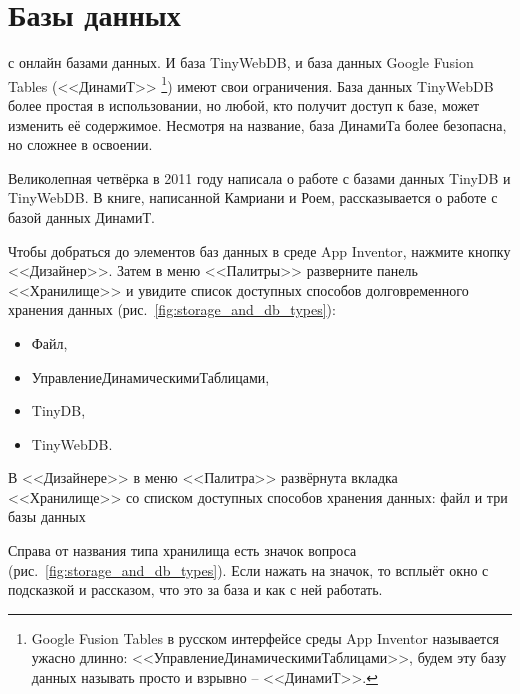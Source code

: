\chapter{Базы данных}
\label{ch:databases}

 с онлайн базами данных. 
И база TinyWebDB, и база данных 
Google Fusion Tables (<<ДинамиТ>>%
\footnote[][-1.0cm]{
        Google Fusion Tables в русском интерфейсе среды App Inventor называется 
        ужасно длинно: <<УправлениеДинамическимиТаблицами>>, 
        будем эту базу данных называть просто и взрывно -- <<ДинамиТ>>. 
}) имеют свои ограничения.
База данных TinyWebDB более простая в использовании, 
но любой, кто получит доступ к базе, может изменить её содержимое. 
Несмотря на название, база ДинамиТа более безопасна, но сложнее в освоении. 

Великолепная четвёрка в 2011 году написала о работе с базами данных 
TinyDB и TinyWebDB\cite{Wolber2011}. 
В книге, написанной Камриани и Роем\cite{KamrianiAndRoy2016}, 
рассказывается о работе с базой данных ДинамиТ. 

Чтобы добраться до элементов баз данных в среде App Inventor, 
нажмите кнопку <<Дизайнер>>. 
Затем в меню <<Палитры>> разверните панель <<Хранилище>> и увидите 
список доступных способов долговременного хранения данных (рис.~\ref{fig:storage_and_db_types}): 
\begin{itemize}
    \item Файл,
    \item УправлениеДинамическимиТаблицами,
    \item TinyDB,
    \item TinyWebDB.
\end{itemize}

\begin{marginfigure}[0.3cm]
{%
\setlength{\fboxsep}{0pt}%
\setlength{\fboxrule}{1pt}%
%
}%
    \caption{В <<Дизайнере>> в меню <<Палитра>> развёрнута вкладка <<Хранилище>> 
    со списком доступных способов хранения данных: файл и три базы данных}
\label{fig:storage_and_db_types}
\end{marginfigure}

Справа от названия типа хранилища есть значок вопроса (рис.~\ref{fig:storage_and_db_types}). 
Если нажать на значок, то всплыёт окно с подсказкой и рассказом, 
что это за база и как с ней работать.


